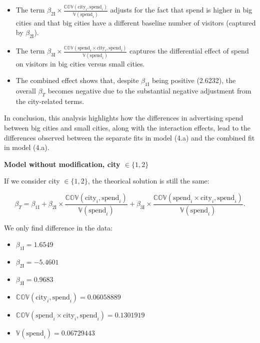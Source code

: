 \documentclass{article}
\begin{document}
\begin{itemize}
    \item The term \(\beta_{2 \text{I}} \times \frac{\mathbb{COV}(\text{city}_i, \text{spend}_i)}{\mathbb{V}(\text{spend}_i)}\) adjusts for the fact that spend is higher in big cities and that big cities have a different baseline number of visitors (captured by \(\beta_{2 \text{I}}\)).

    \item The term \(\beta_{3 \text{I}} \times \frac{\mathbb{COV}(\text{spend}_i \times \text{city}_i, \text{spend}_i)}{\mathbb{V}(\text{spend}_i)}\) captures the differential effect of spend on visitors in big cities versus small cities.

    \item The combined effect shows that, despite \(\beta_{1 \text{I}}\) being positive (2.6232), the overall \(\beta_T\) becomes negative due to the substantial negative adjustment from the city-related terms.
\end{itemize}

In conclusion, this analysis highlights how the differences in advertising spend between big cities and small cities, along with the interaction effects, lead to the differences observed between the separate fits in model (4.a) and the combined fit in model (4.a).

\textbf{Model without modification, city $\in \{1, 2\}$}

If we consider city $\in \{1, 2\}$, the theorical solution is still the same:


\[
\beta_T = \beta_{1 \text{I}} + \beta_{2 \text{I}} \times \frac{\mathbb{COV}(\text{city}_i, \text{spend}_i)}{\mathbb{V}(\text{spend}_i)} + \beta_{3 \text{I}} \times \frac{\mathbb{COV}(\text{spend}_i \times \text{city}_i, \text{spend}_i)}{\mathbb{V}(\text{spend}_i)}.
\]

We only find difference in the data:

\begin{itemize}
    \item \(\beta_{1 \text{I}} = 1.6549\)
    \item \(\beta_{2 \text{I}} = -5.4601\)
    \item \(\beta_{3 \text{I}} = 0.9683\)
    \item \(\mathbb{COV}(\text{city}_i, \text{spend}_i) = 0.06058889\)
    \item \(\mathbb{COV}(\text{spend}_i \times \text{city}_i, \text{spend}_i) = 0.1301919\)
    \item \(\mathbb{V}(\text{spend}_i) = 0.06729443\)
\end{itemize}
\end{document}
